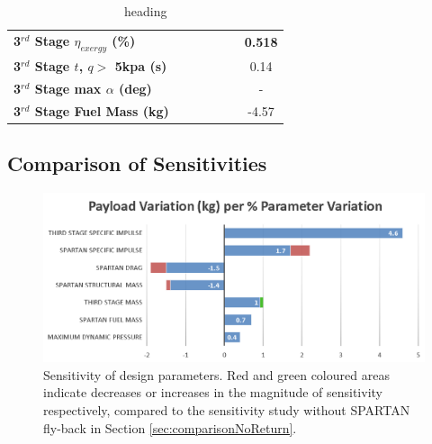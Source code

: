 \begin{table}[ht]
\begin{tabular}{l c c c c c c}
		\\
		\hline 
		\textbf{3$^{rd}$ Stage $\eta_{exergy}$ (\%)}
		& \textbf{\thirddExergyEffISPThreeNinety}
		& \textbf{\thirddExergyEffISPThreeNinetyFive}
		& \textbf{\thirddExergyEffISPThreeStandard}
		& \textbf{\thirddExergyEffISPThreeOneHundredFive}
		& \textbf{\thirddExergyEffISPThreeOneHundredTen}
		& \textbf{0.518}
		\\
		\textbf{3$^{rd}$ Stage $t$, $q >$ 5kpa (s)}
		& \thirdqOverFiveISPThreeNinety
		& \thirdqOverFiveISPThreeNinetyFive
		& \thirdqOverFiveISPThreeStandard
		& \thirdqOverFiveISPThreeOneHundredFive
		& \thirdqOverFiveISPThreeOneHundredTen
		&0.14
		\\
		\textbf{3$^{rd}$ Stage max $\alpha$ (deg)}
		& \thirdmaxAoAISPThreeNinety
		& \thirdmaxAoAISPThreeNinetyFive
		& \thirdmaxAoAISPThreeStandard
		& \thirdmaxAoAISPThreeOneHundredFive
		& \thirdmaxAoAISPThreeOneHundredTen
		& -
		\\
		\textbf{3$^{rd}$ Stage Fuel Mass (kg)}
		& \thirdmFuelISPThreeNinety
		& \thirdmFuelISPThreeNinetyFive
		& \thirdmFuelISPThreeStandard
		& \thirdmFuelISPThreeOneHundredFive
		& \thirdmFuelISPThreeOneHundredTen
		&-4.57
		\\
		\hline 
	\end{tabular} 
	\caption{heading}
	\label{tab:isp3}
\end{table}



\subsection{Comparison of Sensitivities}

\begin{figure}[th]
	\centering
	\includegraphics[width=0.99\linewidth]{figures/6_FlyBack/BarChart}
	\caption{Sensitivity of design parameters. Red and green coloured areas indicate decreases or increases in the magnitude of sensitivity respectively, compared to the sensitivity study without SPARTAN fly-back in Section \ref{sec:comparisonNoReturn}.}
	\label{fig:BarChartreturn}
\end{figure}

